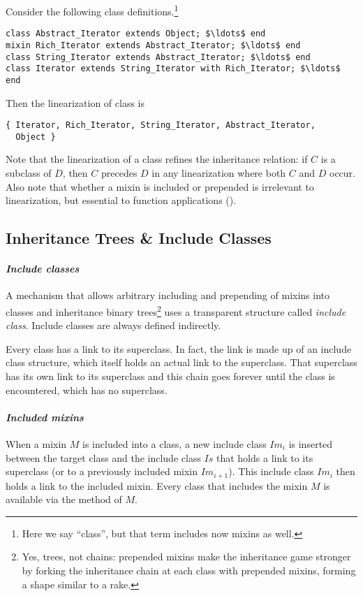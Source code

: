 \example Consider the following class definitions.\footnote{Here we say ``class'', but that term includes now mixins as well.}
\begin{lstlisting}
class Abstract_Iterator extends Object; $\ldots$ end
mixin Rich_Iterator extends Abstract_Iterator; $\ldots$ end
class String_Iterator extends Abstract_Iterator; $\ldots$ end
class Iterator extends String_Iterator with Rich_Iterator; $\ldots$ end
\end{lstlisting}
Then the linearization of class  is
\begin{lstlisting}
{ Iterator, Rich_Iterator, String_Iterator, Abstract_Iterator, 
  Object }
\end{lstlisting}

Note that the linearization of a class refines the inheritance relation: if $C$ is a subclass of $D$, then $C$ precedes $D$ in any linearization where both $C$ and $D$ occur. Also note that whether a mixin is included or prepended is irrelevant to linearization, but essential to function applications ().

\subsection{Inheritance Trees \& Include Classes}
\label{sec:inheritance-trees}
\label{sec:include-classes}

\paragraph{\em Include classes}
A mechanism that allows arbitrary including and prepending of mixins into classes and inheritance binary trees\footnote{Yes, trees, not chains: prepended mixins make the inheritance game stronger by forking the inheritance chain at each class with prepended mixins, forming a shape similar to a rake.} uses a transparent structure called {\em include class}. Include classes are always defined indirectly.

Every class has a link to its superclass. In fact, the link is made up of an include class structure, which itself holds an actual link to the superclass. That superclass has its own link to its superclass and this chain goes forever until the  class is encountered, which has no superclass. 

\paragraph{\em Included mixins}
When a mixin $M$ is included into a class, a new include class $Im_i$ is inserted between the target class and the include class $Is$ that holds a link to its superclass (or to a previously included mixin $Im_{i+1}$). This include class $Im_i$ then holds a link to the included mixin. Every class that includes the mixin $M$ is available via the  method of $M$. 

